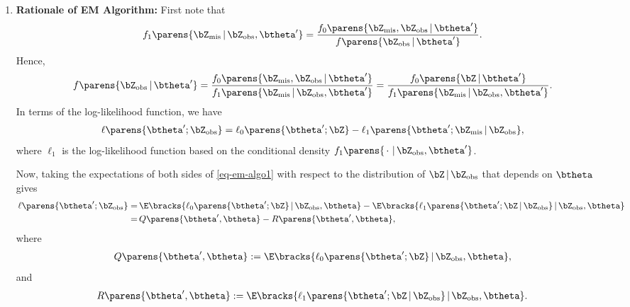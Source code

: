 \documentclass[12pt]{article}
\begin{document}
\begin{enumerate}[label=\textbf{\arabic*.}]
	\item \textbf{Rationale of EM Algorithm:} First note that 
	\begin{align}
		f_1 \parens{\bZ_{\mathrm{mis}} \,\vert\, \bZ_{\mathrm{obs}}, \btheta'} = \frac{f_0 \parens{\bZ_{\mathrm{mis}}, \bZ_{\mathrm{obs}} \,\vert\, \btheta'}}{f \parens{\bZ_{\mathrm{obs}} \,\vert\, \btheta'}}. 
	\end{align}
	Hence, 
	\begin{align}
		f \parens{\bZ_{\mathrm{obs}} \,\vert\, \btheta'} = \frac{f_0 \parens{\bZ_{\mathrm{mis}}, \bZ_{\mathrm{obs}} \,\vert\, \btheta'}}{f_1 \parens{\bZ_{\mathrm{mis}} \,\vert\, \bZ_{\mathrm{obs}}, \btheta'}} = \frac{f_0 \parens{\bZ \,\vert\, \btheta'}}{f_1 \parens{\bZ_{\mathrm{mis}} \,\vert\, \bZ_{\mathrm{obs}}, \btheta'}}. 
	\end{align}
	In terms of the log-likelihood function, we have 
	\begin{align}\label{eq-em-algo1}
		\ell \parens{\btheta'; \bZ_{\mathrm{obs}}} = \ell_0 \parens{\btheta'; \bZ} - \ell_1 \parens{\btheta'; \bZ_{\mathrm{mis}} \,\vert\, \bZ_{\mathrm{obs}}}, 
	\end{align}
	where $\ell_1$ is the log-likelihood function based on the conditional density $f_1 \parens{\,\cdot\, \,\vert\, \bZ_{\mathrm{obs}}, \btheta'}$. 
	
	Now, taking the expectations of both sides of \eqref{eq-em-algo1} with respect to the distribution of $\bZ \,\vert\, \bZ_{\mathrm{obs}}$ that depends on $\btheta$ gives 
	\begin{align*}
		\ell \parens{\btheta'; \bZ_{\mathrm{obs}}} = & \, \E \bracks{\ell_0 \parens{\btheta'; \bZ} \,\vert\, \bZ_{\mathrm{obs}}, \btheta} - \E \bracks{\ell_1 \parens{\btheta'; \bZ \,\vert\, \bZ_{\mathrm{obs}}} \,\vert\, \bZ_{\mathrm{obs}}, \btheta} \\ 
		= & \, Q \parens{\btheta', \btheta} - R \parens{\btheta', \btheta}, 
	\end{align*}
	where 
	\begin{align*}
		Q \parens{\btheta', \btheta} := \E \bracks{\ell_0 \parens{\btheta'; \bZ} \,\vert\, \bZ_{\mathrm{obs}}, \btheta}, 
	\end{align*}
	and 
	\begin{align*}
		R \parens{\btheta', \btheta} := \E \bracks{\ell_1 \parens{\btheta'; \bZ \,\vert\, \bZ_{\mathrm{obs}}} \,\vert\, \bZ_{\mathrm{obs}}, \btheta}. 
	\end{align*}
	

\end{enumerate}
\end{document}

